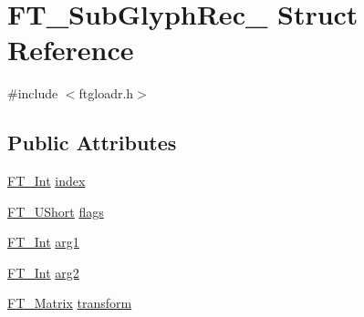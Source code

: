 \hypertarget{struct_f_t___sub_glyph_rec__}{\section{F\-T\-\_\-\-Sub\-Glyph\-Rec\-\_\- Struct Reference}
\label{struct_f_t___sub_glyph_rec__}
}


{\ttfamily \#include $<$ftgloadr.\-h$>$}

\subsection*{Public Attributes}
\begin{DoxyCompactItemize}
\item 
\hyperlink{fttypes_8h_af90e5fb0d07e21be9fe6faa33f02484c}{F\-T\-\_\-\-Int} \hyperlink{struct_f_t___sub_glyph_rec___aa4febc2d867ff074ac116b068f372d3a}{index}
\item 
\hyperlink{fttypes_8h_a937f6c17cf5ffd09086d8610c37b9f58}{F\-T\-\_\-\-U\-Short} \hyperlink{struct_f_t___sub_glyph_rec___a2d02aefc16061f7e039f76074518f6e5}{flags}
\item 
\hyperlink{fttypes_8h_af90e5fb0d07e21be9fe6faa33f02484c}{F\-T\-\_\-\-Int} \hyperlink{struct_f_t___sub_glyph_rec___ad9f6b04ef50e1b39db90331e76f38206}{arg1}
\item 
\hyperlink{fttypes_8h_af90e5fb0d07e21be9fe6faa33f02484c}{F\-T\-\_\-\-Int} \hyperlink{struct_f_t___sub_glyph_rec___a0d27a8b473379cedeb061f9ecd7e97da}{arg2}
\item 
\hyperlink{fttypes_8h_afeacbc4365cf2ad77162b6292f3e3e23}{F\-T\-\_\-\-Matrix} \hyperlink{struct_f_t___sub_glyph_rec___a3c5fc1959a357c6c2b970ec2118d2683}{transform}
\end{DoxyCompactItemize}


